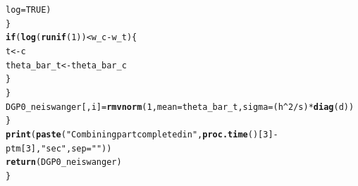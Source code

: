\documentclass[11pt,a4paper]{report}\usepackage[]{graphicx}\usepackage[]{color}
\makeatletter
\newcommand{\hlnum}[1]{\textcolor[rgb]{0.686,0.059,0.569}{#1}}%
\newcommand{\hlstr}[1]{\textcolor[rgb]{0.192,0.494,0.8}{#1}}%
\newcommand{\hlopt}[1]{\textcolor[rgb]{0,0,0}{#1}}%
\newcommand{\hlstd}[1]{\textcolor[rgb]{0.345,0.345,0.345}{#1}}%
\newcommand{\hlkwa}[1]{\textcolor[rgb]{0.161,0.373,0.58}{\textbf{#1}}}%
\newcommand{\hlkwb}[1]{\textcolor[rgb]{0.69,0.353,0.396}{#1}}%
\newcommand{\hlkwc}[1]{\textcolor[rgb]{0.333,0.667,0.333}{#1}}%
\newcommand{\hlkwd}[1]{\textcolor[rgb]{0.737,0.353,0.396}{\textbf{#1}}}%
\newenvironment{kframe}{%
 \def\at@end@of@kframe{}%
 \ifinner\ifhmode%
  \def\at@end@of@kframe{\end{minipage}}%
  \begin{minipage}{\columnwidth}%
 \fi\fi%
 \def\FrameCommand##1{\hskip\@totalleftmargin \hskip-\fboxsep
 \colorbox{shadecolor}{##1}\hskip-\fboxsep
     \hskip-\linewidth \hskip-\@totalleftmargin \hskip\columnwidth}%
 \MakeFramed {\advance\hsize-\width
   \@totalleftmargin\z@ \linewidth\hsize
   \@setminipage}}%
 {\par\unskip\endMakeFramed%
 \at@end@of@kframe}
\newenvironment{knitrout}{}{} %
\makeatother
\begin{document}
\begin{appendix}
\begin{knitrout}
\begin{kframe}
\begin{alltt}
                          \hlkwc{log}\hlstd{=}\hlnum{TRUE}\hlstd{)}
      \hlstd{\}}
      \hlkwa{if}\hlstd{(}\hlkwd{log}\hlstd{(}\hlkwd{runif}\hlstd{(}\hlnum{1}\hlstd{))}\hlopt{<}\hlstd{w_c}\hlopt{-}\hlstd{w_t) \{}
        \hlstd{t}\hlkwb{<-}\hlstd{c}
        \hlstd{theta_bar_t}\hlkwb{<-}\hlstd{theta_bar_c}
      \hlstd{\}}
    \hlstd{\}}
    \hlstd{DGP0_neiswanger[,i]}\hlkwb{=}\hlkwd{rmvnorm}\hlstd{(}\hlnum{1}\hlstd{,}\hlkwc{mean}\hlstd{=theta_bar_t,}\hlkwc{sigma}\hlstd{=(h}\hlopt{^}\hlnum{2}\hlopt{/}\hlstd{s)}\hlopt{*}\hlkwd{diag}\hlstd{(d))}
  \hlstd{\}}
  \hlkwd{print}\hlstd{(}\hlkwd{paste}\hlstd{(}\hlstr{"Combining part completed in "}\hlstd{,} \hlkwd{proc.time}\hlstd{()[}\hlnum{3}\hlstd{]}\hlopt{-}\hlstd{ptm[}\hlnum{3}\hlstd{],}\hlstr{" sec"}\hlstd{,} \hlkwc{sep}\hlstd{=}\hlstr{""}\hlstd{))}
  \hlkwd{return}\hlstd{(DGP0_neiswanger)}
\hlstd{\}}


\end{alltt}
\end{kframe}
\end{knitrout}
\end{appendix}
\end{document}
